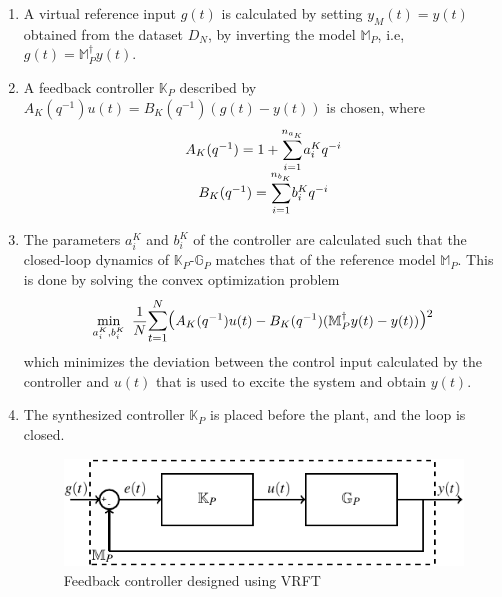 \documentclass[letterpaper, 10 pt, conference]{ieeeconf}  %
\begin{document}
\begin{enumerate}
	\item
	A virtual reference input $g(t)$ is calculated by setting $y_M(t)=y(t)$ obtained from the dataset $D_N$, by inverting the model $\mathbb{M}_P$, i.e, $g(t) = \mathbb{M}_P^{\dagger}y(t) $.
	\item
	A feedback controller $\mathbb{K}_P$ described by $A_K(q^{-1})u(t) = B_K(q^{-1})(g(t)-y(t))$ is chosen, where 
	\begin{equation*}
	\begin{matrix}
	A_K(q^{-1}) = 1+\mathlarger{\sum\limits_{i=1}^{n_{a_K}}}a_i^Kq^{-i}\\
	B_K(q^{-1}) = \mathlarger{\sum\limits_{i=1}^{n_{b_K}}}b_i^Kq^{-i}
	\end{matrix}  
	\end{equation*}
	\item
		The parameters $a_i^K$ and $b_i^K$  of the controller are calculated such that the closed-loop dynamics of $\mathbb{K}_P$-$\mathbb{G}_P$ matches that of  the reference model $\mathbb{M}_P$.
	This is done by solving the convex optimization problem
	\begin{equation}
	\small
	\begin{aligned}
	 \underset{a_i^K,b_i^K}{\text{min}}
	 & \hspace{5pt} \frac{1}{N}\mathlarger{\sum\limits_{t=1}^N}\mathlarger{\mathlarger{(}}A_K(q^{-1})u(t)-B_K(q^{-1})(\mathbb{M}_P^{\dagger}y(t)-y(t))\mathlarger{\mathlarger{)}}^2 \\
	\end{aligned}
	\label{VRFT_problem}
	\end{equation}
	\normalsize
	which minimizes the deviation between the control input calculated by the controller and $u(t)$ that is used to excite the system and obtain $y(t)$.
	\item
	The synthesized controller $\mathbb{K}_P$ is placed before the plant, and the loop is closed.
	\begin{figure}[h]
		\hspace{30pt}
	\includegraphics[scale=0.8]{KpGp.pdf}
	\caption{Feedback controller designed using VRFT}
	\end{figure}
\end{enumerate}
\end{document}
